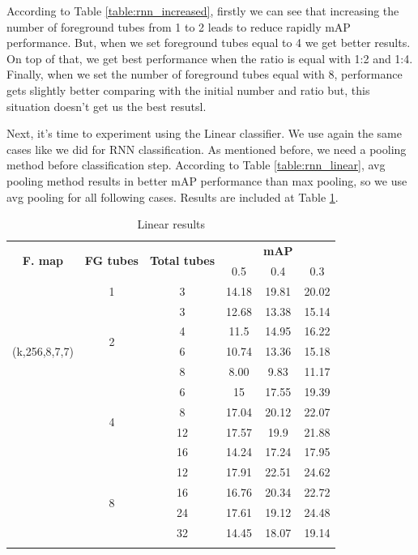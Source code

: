 \documentclass{report}
\begin{document}
According to Table \ref{table:rnn_increased}, firstly we can see that increasing the number of foreground tubes from 1 to 2 leads to reduce
rapidly mAP performance. But, when we set foreground tubes equal to 4 we get better results. On top of that, we get best performance when
the ratio is equal with 1:2 and 1:4. Finally, when we set the number of foreground tubes equal with 8, performance gets slightly better
comparing with the initial number and ratio but, this situation doesn't get us the best resutsl. \par 
Next, it's time to experiment using the Linear classifier. We use again the same cases like we did for RNN classification. As mentioned
before, we need a pooling method before classification step. According to Table \ref{table:rnn_linear}, avg pooling method results in
better mAP performance than max pooling, so we use avg pooling for all following cases. Results are included at Table \ref{table:linear_increased}.

\begin{center}
  \begin{longtable}{|| c | c | c || c c c||}
    \hline
    \multirow{2}{*}{\textbf{F. map}} & \multirow{2}{*}{\textbf{FG tubes}} & \multirow{2}{*}{\textbf{Total tubes}} & {} & \textbf{mAP} & {} \\
    {}  & {} & {} & 0.5 & 0.4 & 0.3 \\
    \hline
    \multirow{7}{*}{(k,256,8,7,7)}  & 1 & 3& 14.18 &19.81 & 20.02 \\
    \cline{2-6}
    {} & \multirow{4}{*}{2} & 3 & 12.68 & 13.38 & 15.14 \\
    \cline{3-6}
    {} & {} & 4 & 11.5 & 14.95 & 16.22 \\
    \cline{3-6}
    {} & {} & 6 & 10.74 & 13.36 & 15.18 \\
    \cline{3-6}
    {} & {} & 8 & 8.00 & 9.83 & 11.17 \\
    \cline{2-6}
    {} & \multirow{4}{*}{4} & 6 & 15 & 17.55 & 19.39 \\
    \cline{3-6}
    {} & {} & 8 & 17.04	& 20.12 &22.07 \\
    \cline{3-6}
    {} & {} & 12 & 17.57 & 19.9 & 21.88 \\
    \cline{3-6}
    {} & {} & 16 & 14.24 & 17.24 & 17.95 \\

    \cline{2-6}
    {} & \multirow{4}{*}{8} & 12 & 17.91 & 22.51 & 24.62 \\
    \cline{3-6}
    {} & {} & 16 & 16.76 & 20.34 & 22.72 \\
    \cline{3-6}
    {} & {} & 24 & 17.61 & 19.12 & 24.48 \\
    \cline{3-6}
    {} & {} & 32 & 14.45 & 18.07 & 19.14  \\
    \hline

    \caption{Linear results }
    \label{table:linear_increased}
  \end{longtable}
\end{center}
\end{document}
